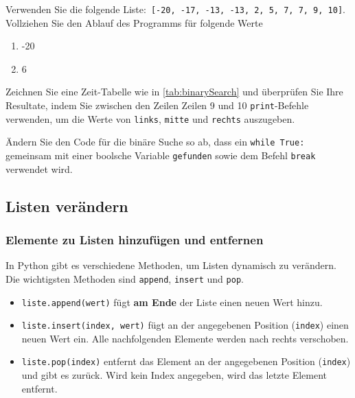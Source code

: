 \begin{myexercise}
    Verwenden Sie die folgende Liste: \lstinline|[-20, -17, -13, -13, 2, 5, 7, 7, 9, 10]|. Vollziehen Sie den Ablauf des Programms für folgende Werte
    \begin{enumerate}
        \item -20
        \item 6
    \end{enumerate}
    Zeichnen Sie eine Zeit-Tabelle wie in \cref{tab:binarySearch} und überprüfen Sie Ihre Resultate, indem Sie zwischen den Zeilen Zeilen 9 und 10 \lstinline|print|-Befehle verwenden, um die Werte von \lstinline|links|, \lstinline|mitte| und \lstinline|rechts| auszugeben.
\end{myexercise}

\begin{myexercise}
    Ändern Sie den Code für die binäre Suche so ab, dass ein \lstinline|while True:| gemeinsam mit einer boolsche Variable \lstinline|gefunden| sowie dem Befehl \lstinline|break| verwendet wird.
    \begin{myanswer}
        
    \end{myanswer}
\end{myexercise}


\subsection{Listen verändern}
\subsubsection{Elemente zu Listen hinzufügen und entfernen}

In Python gibt es verschiedene Methoden, um Listen dynamisch zu verändern. Die wichtigsten Methoden sind \lstinline|append|, \lstinline|insert| und \lstinline|pop|.

\begin{mydefinition}
\begin{itemize}
    \item \lstinline|liste.append(wert)| fügt \textbf{am Ende} der Liste einen neuen Wert hinzu.
    \item \lstinline|liste.insert(index, wert)| fügt an der angegebenen Position (\texttt{index}) einen neuen Wert ein. Alle nachfolgenden Elemente werden nach rechts verschoben.
    \item \lstinline|liste.pop(index)| entfernt das Element an der angegebenen Position (\texttt{index}) und gibt es zurück. Wird kein Index angegeben, wird das letzte Element entfernt.
\end{itemize}
\end{mydefinition}

